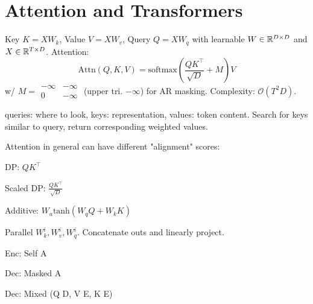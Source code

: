 \section{Attention and Transformers}


\begin{definition}[Transformer]
    Key \(K= XW_k\), Value \(V = XW_v\), Query \(Q = XW_q\) with learnable \(W \in \mathbb{R}^{D \times D}\) and \(X \in \mathbb{R}^{T \times D}\).
    Attention:
    \[ \text{Attn}(Q,K,V) = \text{softmax}\left(\frac{QK^\top}{\sqrt D} + M\right)V \]
    w/ \(M = \begin{smallmatrix}-\infty & -\infty \\ 0 & -\infty\end{smallmatrix}\) (upper tri. \(-\infty\)) for AR masking.
    Complexity: \(\mathcal{O}(T^2D)\).
\end{definition}

\begin{lemma}
    queries: where to look, keys: representation, values: token content. Search for keys similar to query, return corresponding weighted values.
\end{lemma}

\begin{definition}[Attention]
    Attention in general can have different "alignment" scores:
    \begin{itemize*}
        \item DP: \(QK^\top\)
        \item Scaled DP: \(\frac{QK^\top}{\sqrt D}\)
        \item Additive: \(W_a \text{tanh}(W_q Q + W_k K)\)
    \end{itemize*}
\end{definition}

\begin{definition}[MHA]
    Parallel \(W_k^i, W_v^i, W_q^i\). Concatenate outs and linearly project.
\end{definition}

\begin{definition}[Usage]
    \begin{itemize*}
        \item Enc: Self A
        \item Dec: Masked A
        \item Dec: Mixed (Q D, V E, K E)
    \end{itemize*}
\end{definition}

